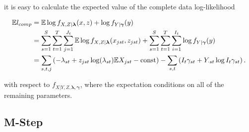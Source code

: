 \documentclass[12pt]{article}\usepackage[]{graphicx}\usepackage[]{color}
\begin{document}
\noindent it is easy to calculate the expected value of the complete data log-likelihood

\begin{align*}
  \mathbb{E} l_{comp} 
  & = \mathbb{E} \log{f_{X,Z|\boldsymbol{\lambda}}(x,z)} + \log{f_{Y|\boldsymbol{\gamma}}(y)} \\
  & = \sum_{s=1}^S \sum_{t=1}^T \sum_{j=1}^{J_t} \mathbb{E} \log{f_{X,Z|\boldsymbol{\lambda}}(x_{jst},z_{jst})}
  + \sum_{s=1}^S \sum_{t=1}^T \sum_{i=1}^{I_t} \log{f_{Y|\boldsymbol{\gamma}}(y)} \\
  & = \sum_{s,t,j} \left( - \lambda_{st} 
    + z_{jst} \log(\lambda_{st}) \mathbb{E} X_{jst}  - \text{const} \right) - \sum_{s,t} \left( I_t \gamma_{st} + Y_{\cdot st} \log{I_t \gamma_{st}} \right).
\end{align*}

with respect to $f_{X|Y,Z,\boldsymbol{\lambda},\boldsymbol{\gamma}}$, where the expectation conditions on all of the remaining parameters.

  




\subsection*{M-Step}
\end{document}
